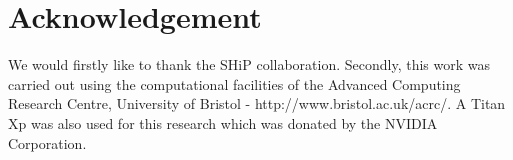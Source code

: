 \documentclass{article}
\begin{document}
\section{Acknowledgement}

We would firstly like to thank the SHiP collaboration. Secondly, this work was carried out using the computational facilities of the Advanced Computing Research Centre, University of Bristol - http://www.bristol.ac.uk/acrc/. A Titan Xp was also used for this research which was donated by the NVIDIA Corporation. 




\end{document}
